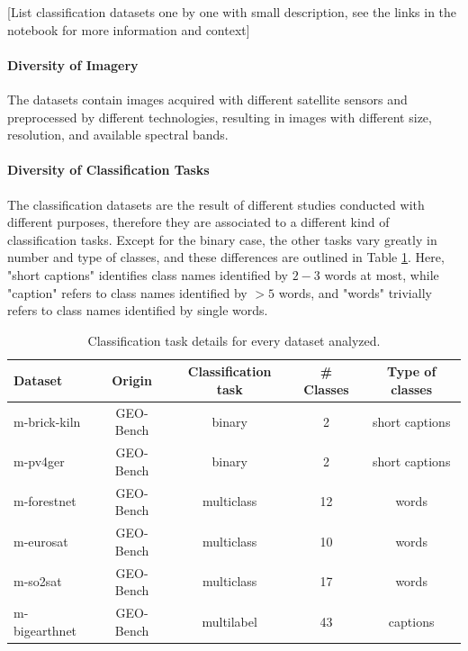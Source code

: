 \documentclass[a4paper, oneside, english]{sapthesis}
\begin{document}
[List classification datasets one by one with small description, see the links in the notebook for more information and context] 


\paragraph{Diversity of Imagery} The datasets contain images acquired with different satellite sensors and preprocessed by different technologies, resulting in images with different size, resolution, and available spectral bands.


\paragraph{Diversity of Classification Tasks} The classification datasets are the result of different studies conducted with different purposes, therefore they are associated to a different kind of classification tasks. Except for the binary case, the other tasks vary greatly in number and type of classes, and these differences are outlined in Table \ref{tab:classtypes}. Here, "short captions" identifies class names identified by $2-3$ words at most, while "caption" refers to class names identified by $>5$ words, and "words" trivially refers to class names identified by single words.


\begin{table}[ht]
\centering
\footnotesize
\renewcommand{\arraystretch}{1.2}
    \begin{tabular}{lcccc}
    \toprule
    \textbf{Dataset} & \textbf{Origin} & \textbf{Classification task} & \textbf{\# Classes} & \textbf{Type of classes}  \\
    \midrule
    m-brick-kiln & GEO-Bench & binary & 2 & short captions \\
    m-pv4ger & GEO-Bench & binary & 2 & short captions \\
    m-forestnet & GEO-Bench & multiclass & 12 & words \\
    m-eurosat & GEO-Bench & multiclass & 10 & words \\
    m-so2sat & GEO-Bench & multiclass & 17 & words \\
    m-bigearthnet & GEO-Bench & multilabel & 43 & captions \\
    \bottomrule
    \end{tabular}
\vspace{0.3cm}
\caption{\normalsize Classification task details for every dataset analyzed.}
\label{tab:classtypes}
\end{table}
\end{document}
